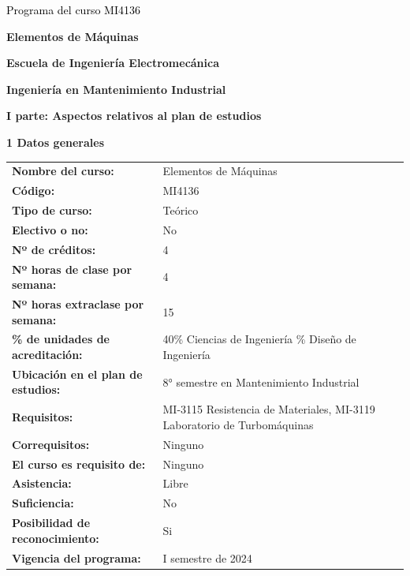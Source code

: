 \documentclass[letterpaper]{article}%
\begin{document}
%
\normalsize%
\thispagestyle{empty}%
%
\vspace*{150mm}%
\par\fontsize{14}{0}\selectfont \textcolor{black}{Programa del curso MI4136}%
\par\fontsize{18}{25}\selectfont \textbf{\textcolor{azulsuaveTEC}{Elementos de Máquinas}}%
\par\hspace*{10mm}\fontsize{12}{30}\selectfont \textbf{\textcolor{gris}{Escuela de Ingeniería Electromecánica}}%
\par\hspace*{10mm}\fontsize{12}{14}\selectfont \textbf{\textcolor{gris}{Ingeniería en Mantenimiento Industrial}}%
\newpage%
\pagestyle{headfoot}%
\par\fontsize{14}{0}\selectfont \textbf{\textcolor{parte}{I parte: Aspectos relativos al plan de estudios}}%
\par\hspace*{4mm}\fontsize{12}{20}\selectfont \textbf{\textcolor{parte}{1 Datos generales}}%
\renewcommand{\arraystretch}{1.5}%
\begin{longtable}{m{7cm}m{9cm}}%
\textbf{Nombre del curso:}&Elementos de Máquinas\\%
\textbf{Código:}&MI4136\\%
\textbf{Tipo de curso:}&Teórico\\%
\textbf{Electivo o no:}&No\\%
\textbf{Nº de créditos:}&4\\%
\textbf{Nº horas de clase por semana:}&4\\%
\textbf{Nº horas extraclase por semana:}&15\\%
\textbf{\% de unidades de acreditación:}&40\% Ciencias de Ingeniería
\newline%
60\% Diseño de Ingeniería\\%
\textbf{Ubicación en el plan de estudios:}&8° semestre en Mantenimiento Industrial\\%
\textbf{Requisitos:}&MI{-}3115 Resistencia de Materiales, MI{-}3119 Laboratorio 
\newline%
de Turbomáquinas\\%
\textbf{Correquisitos:}&Ninguno\\%
\textbf{El curso es requisito de:}&Ninguno\\%
\textbf{Asistencia:}&Libre\\%
\textbf{Suficiencia:}&No\\%
\textbf{Posibilidad de reconocimiento:}&Si\\%
\textbf{Vigencia del programa:}&I semestre de 2024\\%
\end{longtable}%
\end{document}
